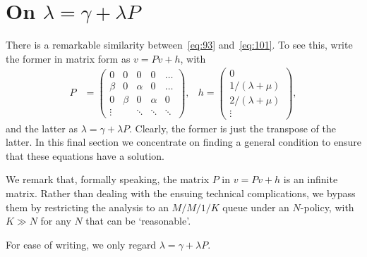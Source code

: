 



\section{On $\lambda = \gamma + \lambda P$}
\label{sec:lambda-=-gamma}

There is a remarkable similarity between~\cref{eq:93} and~\cref{eq:101}.
To see this, write the former in matrix form as $v = Pv + h$,
with \begin{align*}
  P &=
  \begin{pmatrix}
    0 & 0 & 0 & 0&  \hdots\\
    \beta & 0  & \alpha & 0 & \hdots \\
    0 & \beta & 0 & \alpha  & 0 \\
    \vdots &  & \ddots & \ddots& \ddots
  \end{pmatrix},
& h =
                   \begin{pmatrix}
                     0 \\
                     1/(\lambda + \mu)\\
                     2/(\lambda + \mu)\\
                     \vdots
                   \end{pmatrix},
\end{align*}
and the latter as $\lambda = \gamma + \lambda P$.
Clearly, the former is just the transpose of the latter.
In this final section we concentrate on finding a general condition to ensure that these equations have a solution.

We remark that, formally speaking, the matrix $P$ in $v=Pv +h$ is an infinite matrix.
Rather than dealing with the ensuing technical complications, we bypass them by restricting the analysis to an $M/M/1/K$ queue under an $N$-policy, with $K\gg N$ for any $N$ that can be `reasonable'.

For ease of writing, we only regard $\lambda = \gamma + \lambda P$.

